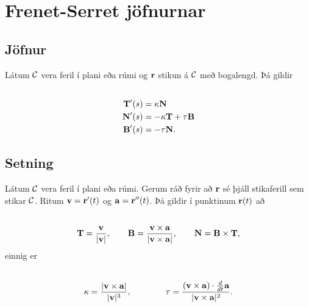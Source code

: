\documentclass[a4paper,10pt,icelandic]{sphinxmanual}
\begin{document}
\section{Frenet-Serret jöfnurnar}
\label{Kafli1:frenet-serret-jofnurnar}

\subsection{Jöfnur}
\label{Kafli1:index-19}\label{Kafli1:jofnur}
Látum \(\cal C\) vera feril í plani eða rúmi og
\(\mbox{${\bf r}$}\) stikun á \(\cal C\) með bogalengd. Þá
gildir
\begin{gather}
\begin{split}\displaystyle\end{split}\notag\\\begin{split}\begin{aligned}
\mbox{${\bf T}$}'(s)&=\kappa\mbox{${\bf N}$}\\
\mbox{${\bf N}$}'(s)&=-\kappa\mbox{${\bf T}$}+\tau\mbox{${\bf B}$}\\
\mbox{${\bf B}$}'(s)&=-\tau\mbox{${\bf N}$}.\end{aligned}\end{split}\notag
\end{gather}

\subsection{Setning}
\label{Kafli1:id19}
Látum \(\cal C\) vera feril í plani eða rúmi. Gerum ráð fyrir að
\(\mbox{${\bf r}$}\) sé þjáll stikaferill sem stikar \(\cal C\).
Ritum \(\mbox{${\bf v}$}=\mbox{${\bf r}$}'(t)\) og
\(\mbox{${\bf a}$}=\mbox{${\bf r}$}''(t)\). Þá gildir í punktinum
\(\mbox{${\bf r}$}(t)\) að
\begin{gather}
\begin{split}\displaystyle\end{split}\notag\\\begin{split}\mbox{${\bf T}$}=\frac{\mbox{${\bf v}$}}{|\mbox{${\bf v}$}|},\qquad
\mbox{${\bf B}$}=\frac{\mbox{${\bf v}$}\times\mbox{${\bf a}$}}{|\mbox{${\bf v}$}\times\mbox{${\bf a}$}|},\qquad
\mbox{${\bf N}$}=\mbox{${\bf B}$}\times\mbox{${\bf T}$},\end{split}\notag
\end{gather}
einnig er
\begin{gather}
\begin{split}\displaystyle\end{split}\notag\\\begin{split}\kappa=\frac{|\mbox{${\bf v}$}\times\mbox{${\bf a}$}|}{|\mbox{${\bf v}$}|^3},\qquad\qquad
\tau=\frac{(\mbox{${\bf v}$}\times\mbox{${\bf a}$})\cdot \frac{d}{dt}\mbox{${\bf a}$}}{|\mbox{${\bf v}$}\times\mbox{${\bf a}$}|^2}.\end{split}\notag
\end{gather}
\end{document}
